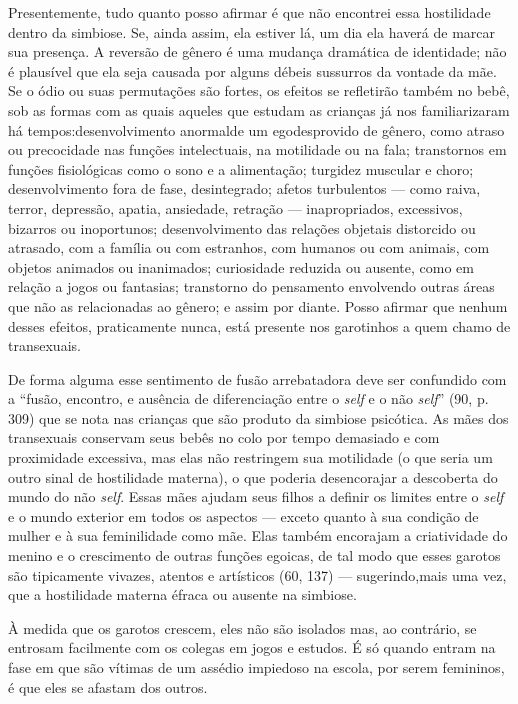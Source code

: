 Presentemente, tudo quanto posso afirmar é que não encontrei essa
hostilidade dentro da simbiose. Se, ainda assim, ela estiver lá, um dia
ela haverá de marcar sua presença. A reversão de gênero\idxidenrev{} é uma mudança
dramática de identidade; não é plausível que ela seja causada por
alguns débeis sussurros da vontade da mãe. Se o ódio ou suas
permutações são fortes, os efeitos se refletirão também no bebê, sob as
formas com as quais aqueles que estudam as crianças já nos
familiarizaram há tempos:\idxtransepres[|(] desenvolvimento anormal\idxegoi[|(] de um ego\idxinfanego[|(] desprovido
de gênero, como atraso ou precocidade nas funções intelectuais, na
motilidade ou na fala; transtornos em funções fisiológicas como o sono
e a alimentação; turgidez muscular e choro; desenvolvimento fora de
fase, desintegrado; afetos turbulentos --- como raiva, terror,
depressão, apatia, ansiedade, retração --- inapropriados, excessivos,
bizarros ou inoportunos; desenvolvimento das relações objetais
distorcido ou atrasado, com a família ou com estranhos, com humanos ou
com animais, com objetos animados ou inanimados; curiosidade reduzida
ou ausente, como em relação a jogos ou fantasias; transtorno do
pensamento envolvendo outras áreas que não as relacionadas ao gênero; e
assim por diante. Posso afirmar que nenhum desses efeitos, praticamente
nunca, está presente nos garotinhos a quem chamo de transexuais.

De forma alguma esse sentimento de fusão arrebatadora deve ser
confundido com a ``fusão, encontro, e ausência de
diferenciação entre o \textit{self} e o não \textit{self}'' (90, p.\,309) que
se nota nas crianças que são produto da simbiose psicótica. As mães dos
transexuais conservam seus bebês no colo por tempo demasiado e com
proximidade excessiva, mas elas não restringem sua motilidade (o que
seria um outro sinal de hostilidade materna), o que poderia
desencorajar a descoberta do mundo do não \textit{self}. Essas mães ajudam seus
filhos a definir os limites entre o \textit{self} e o mundo exterior em todos os
aspectos --- exceto quanto à sua condição de mulher e à sua
feminilidade como mãe. Elas também encorajam a criatividade\idxcriatran{} do menino e
o crescimento de outras funções egoicas, de tal modo que esses garotos
são tipicamente vivazes, atentos e artísticos (60, 137) --- sugerindo,\idxhostmaes[|)]
mais uma vez, que a hostilidade materna é\idxmaesfilh[|)] fraca ou ausente na simbiose.\idxangushos[|)]

À medida que os garotos crescem, eles não são isolados mas, ao
contrário, se entrosam facilmente com os colegas em jogos e estudos. É
só quando entram na fase em que são vítimas de um assédio impiedoso na
escola, por serem femininos, é que eles se afastam dos outros.

